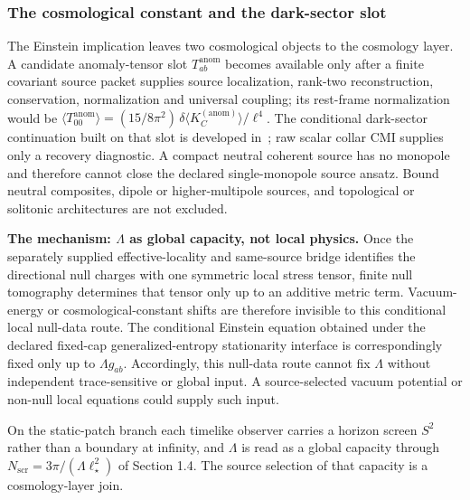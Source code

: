 \subsubsection{The cosmological constant and the dark-sector slot}\label{515-dark-matter-as-modular-anomaly}\label{516-de-sitter-holography-static-patch-vs-boundary-at-infinity}

The Einstein implication leaves two cosmological objects to the cosmology layer. A candidate
anomaly-tensor slot \(T_{ab}^{\mathrm{anom}}\) becomes available only after a finite covariant
source packet supplies source localization, rank-two reconstruction, conservation,
normalization and universal coupling; its rest-frame normalization would be
\(\langle T_{00}^{\mathrm{anom}}\rangle=(15/8\pi^2)\,\delta\langle K_C^{(\mathrm{anom})}\rangle/\ell^4\).
The conditional dark-sector continuation built on that slot is developed
in~\cite{ophdarkmatter}; raw scalar collar CMI supplies only a recovery diagnostic. A
compact neutral coherent source has no monopole and therefore cannot close the declared
single-monopole source ansatz. Bound neutral composites, dipole or higher-multipole sources,
and topological or solitonic architectures are not excluded.

\textbf{The mechanism: \(\Lambda\) as global capacity, not local physics.} Once the separately supplied effective-locality and same-source bridge identifies the directional null charges with one symmetric local stress tensor, finite null tomography determines that tensor only up to an additive metric term. Vacuum-energy or cosmological-constant shifts are therefore invisible to this conditional local null-data route. The conditional Einstein equation obtained under the declared fixed-cap generalized-entropy stationarity interface is correspondingly fixed only up to \(\Lambda g_{ab}\). Accordingly, this null-data route cannot fix \(\Lambda\) without independent trace-sensitive or global input. A source-selected vacuum potential or non-null local equations could supply such input.

On the static-patch branch each timelike observer carries a horizon screen \(S^2\) rather than
a boundary at infinity, and \(\Lambda\) is read as a global capacity through
\(N_{\mathrm{scr}}=3\pi/(\Lambda\ell_\star^2)\) of Section 1.4. The source selection of that
capacity is a cosmology-layer join.

